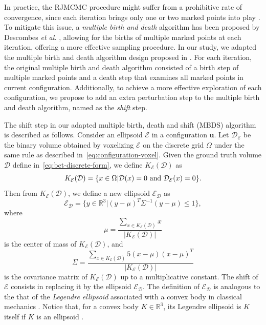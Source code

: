 \documentclass[journal]{IEEEtran}
\begin{document}
In practice, the RJMCMC procedure might suffer from a prohibitive rate
of convergence, since each iteration brings only one or two marked
points into play \cite{descombes2013stochastic}. To mitigate this
issue, a \textit{multiple birth and death} algorithm has been proposed
by Descombes \textit{et al.} \cite{descombes2009object}, allowing for
the births of multiple marked points at each iteration, offering a
more effective sampling procedure. In our study, we adapted the
multiple birth and death algorithm design proposed in
\cite{descombes2009object}. For each iteration, the original multiple
birth and death algorithm consisted of a birth step of multiple marked
points and a death step that examines all marked points in current
configuration. Additionally, to achieve a more effective exploration
of each configuration, we propose to add an extra perturbation step to
the multiple birth and death algorithm, named as the \textit{shift}
step.

The shift step in our adapted multiple birth, death and shift (MBDS)
algorithm is described as follows. Consider an ellipsoid $\mathcal{E}$
in a configuration $\mathbf{u}$. Let $\mathcal{D}_{\mathcal{E}}$ be
the binary volume obtained by voxelizing $\mathcal{E}$ on the discrete
grid $\Omega$ under the same rule as described
in~\eqref{eq:configuration-voxel}. Given the ground truth volume
$\mathcal{D}$ define in~\eqref{eq:bct-discrete-form}, we define
$K_{\mathcal{E}}(\mathcal{D})$ as
\begin{equation}
  \label{eq:overlap-voxels}
  K_{\mathcal{E}}(\mathcal{D}) = \{x \in \Omega |
  \mathcal{D}(x) = 0 \textnormal{ and }
  \mathcal{D}_{\mathcal{E}}(x) = 0 \}.
\end{equation}
Then from $K_{\mathcal{E}}(\mathcal{D})$, we define a new ellipsoid
$\mathcal{E}_{\mathcal{D}}$ as
\begin{equation}
  \label{eq:ellip-approx}
  \mathcal{E}_{\mathcal{D}} = \{ y \in \mathbb{R}^{3} |
  (y-\mu)^T \Sigma^{-1} (y-\mu) \leq 1 \},
\end{equation}
where
$$
\mu = \frac{\sum_{x \in K_{\mathcal{E}}(\mathcal{D})} x }{
  |K_{\mathcal{E}}(\mathcal{D})| }
$$
is the center of mass of $K_{\mathcal{E}}(\mathcal{D})$, and
$$
\Sigma = \frac{\sum_{x \in K_{\mathcal{E}}(\mathcal{D})} 5(x - \mu)(x
  - \mu)^T } { |K_{\mathcal{E}}(\mathcal{D})| }
$$
is the covariance matrix of $K_{\mathcal{E}}(\mathcal{D})$ up to a
multiplicative constant. The shift of $\mathcal{E}$ consists in
replacing it by the ellipsoid $\mathcal{E}_{\mathcal{D}}$. The
definition of $\mathcal{E}_{\mathcal{D}}$ is analogous to the that of
the \textit{Legendre ellipsoid} associated with a convex body in
classical mechanics \cite{lutwak2000new}. Notice that, for a convex
body $K \in \mathbb{R}^3$, its Legendre ellipsoid is $K$ itself if $K$
is an ellipsoid \cite{ludwig2003ellipsoids}.
\end{document}
